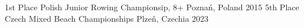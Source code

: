 



\begin{cvhonors}

  \cvhonor
    {1st Place} %
    {Polish Junior Rowing Championsip, 8+} %
    {Poznań, Poland} %
    {2015} %
	\cvhonor
	{5th Place}
		{Czech Mixed Beach Championships}
		{Plzeň, Czechia}
		{2023}
\end{cvhonors}

